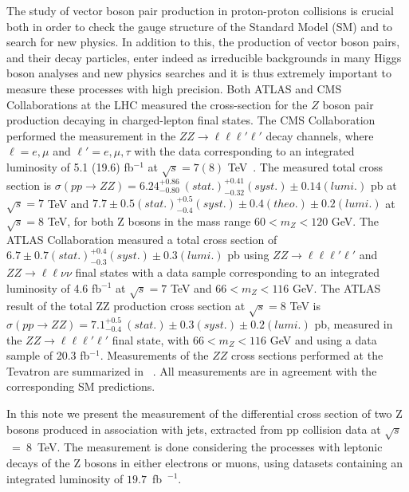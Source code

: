 The study of vector boson pair production in proton-proton collisions is crucial both in order to check the gauge structure
of the Standard Model (SM) and to search for new physics. In addition to this, the production of vector boson pairs, and their 
decay particles, enter indeed as irreducible backgrounds in many Higgs boson analyses and new physics searches and it is thus extremely 
important to measure these processes with high precision. 
Both ATLAS and CMS Collaborations at the LHC measured the cross-section for the $Z$ boson pair production decaying in charged-lepton final states. The CMS Collaboration performed the measurement in the 
$ZZ \to \ell\ell\ell'\ell'$ decay channels, where $\ell = e,\mu$ and $\ell' = e,\mu,\tau$ with the data corresponding
to an integrated luminosity of 5.1 (19.6) fb$^{-1}$ at $\sqrt{s}= 7(8)$ TeV~\cite{ZZXS7TeVPaper, ZZXSPaper}. The measured total cross section is 
$\sigma(pp \to ZZ) =  6.24^{+0.86}_{-0.80}\ (stat.)^{+0.41}_{-0.32}(syst.) \pm 0.14 (lumi.)$ pb at $\sqrt{s}= 7$ TeV and $7.7 \pm
0.5 (stat.) ^{+0.5}_{-0.4}(syst.) \pm 0.4 (theo.) \pm 0.2 (lumi.)$ at $\sqrt{s}= 8$ TeV, for both Z bosons in the mass
range $60 < m_{Z} < 120$ GeV. The ATLAS Collaboration measured a total cross section of $6.7 \pm 0.7 (stat.) ^{+0.4}_{-0.3}(syst.)
\pm 0.3 (lumi.)$ pb using $ZZ\to \ell\ell\ell'\ell'$ and  $ZZ\to \ell\ell\nu\nu$ final states with a data sample corresponding
to an integrated luminosity of 4.6 fb$^{-1}$ at $\sqrt{s}= 7$ TeV and $66 < m_{Z} < 116$ GeV. The ATLAS
 result of the total ZZ production cross section  at $\sqrt{s}= 8$ TeV is
 $\sigma(pp \to ZZ) =  7.1^{+0.5}_{-0.4}\ (stat.)\pm 0.3 (syst.) 
\pm 0.2 (lumi.)$ pb, measured in the $ZZ\to \ell\ell\ell'\ell'$ final state, with $66 < m_{Z} < 116$ GeV and using
a data sample of 20.3 fb$^{-1}$. Measurements of the $ZZ$ cross sections performed at the Tevatron are
summarized in ~\cite{ZZTevatronCDF,ZZTevatronD0}. All measurements are in agreement with the corresponding SM predictions.


In this note we present the measurement of the differential cross section of two Z bosons produced
in association with jets, extracted from pp collision data at $\sqrt{s}$~=~8~TeV. The measurement is done
considering the processes with leptonic decays of the Z bosons in either electrons or muons, using datasets
containing an integrated luminosity of $19.7$~fb~$^{-1}$.


